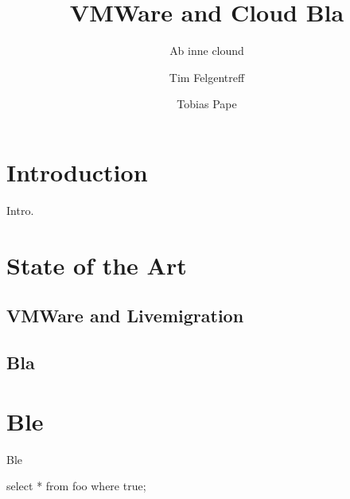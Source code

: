 \documentclass{scrartcl}
\title{VMWare and Cloud Bla}
\subtitle{Ab inne clound}
\author{Tim Felgentreff \and Tobias Pape}
\begin{document}
\maketitle
\tableofcontents

\section{Introduction}
\label{sec:introduction}

Intro.

\section{State of the Art}
\label{sec:sota}

\blindtext

\subsection{VMWare and Livemigration}
\label{sec:vmware}

\blindtext

\subsection{Bla}
\label{sec:bla}

\blindtext

\ParSep

\blindtext

\section{Ble}
\label{sec:ble}

Ble

\begin{code}[language=SQL]
select  * from foo where true;
\end{code}
\blinddocument

\nocite{*}

\end{document}
